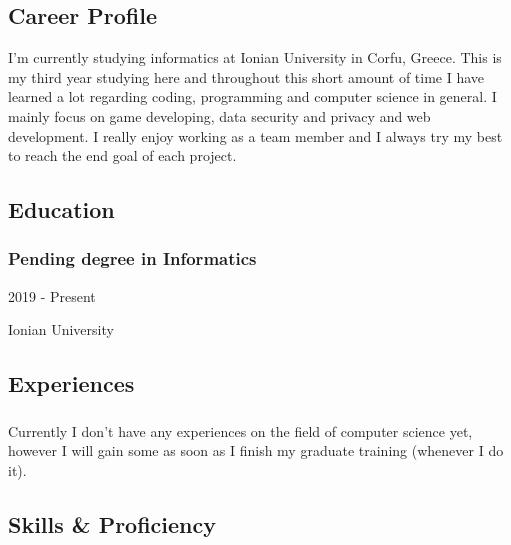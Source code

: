 \documentclass[english,]{article}
\begin{document}
\hypertarget{career-profile}{%
\subsection{\texorpdfstring{{ \emph{} \emph{} } Career
Profile}{    Career Profile}}\label{career-profile}}

I'm currently studying informatics at Ionian University in Corfu,
Greece. This is my third year studying here and throughout this short
amount of time I have learned a lot regarding coding, programming and
computer science in general. I mainly focus on game developing, data
security and privacy and web development. I really enjoy working as a
team member and I always try my best to reach the end goal of each
project.

\hypertarget{education}{%
\subsection{\texorpdfstring{{ \emph{} \emph{} }
Education}{    Education}}\label{education}}

\hypertarget{pending-degree-in-informatics}{%
\subsubsection{Pending degree in
Informatics}\label{pending-degree-in-informatics}}

2019 - Present

Ionian University

\hypertarget{experiences}{%
\subsection{\texorpdfstring{{ \emph{} \emph{} }
Experiences}{    Experiences}}\label{experiences}}

\hypertarget{section}{%
\subsubsection{}\label{section}}

Currently I don't have any experiences on the field of computer science
yet, however I will gain some as soon as I finish my graduate training
(whenever I do it).

\hypertarget{skills-proficiency}{%
\subsection{\texorpdfstring{{ \emph{} \emph{} } Skills \&
Proficiency}{    Skills \& Proficiency}}\label{skills-proficiency}}
\end{document}
